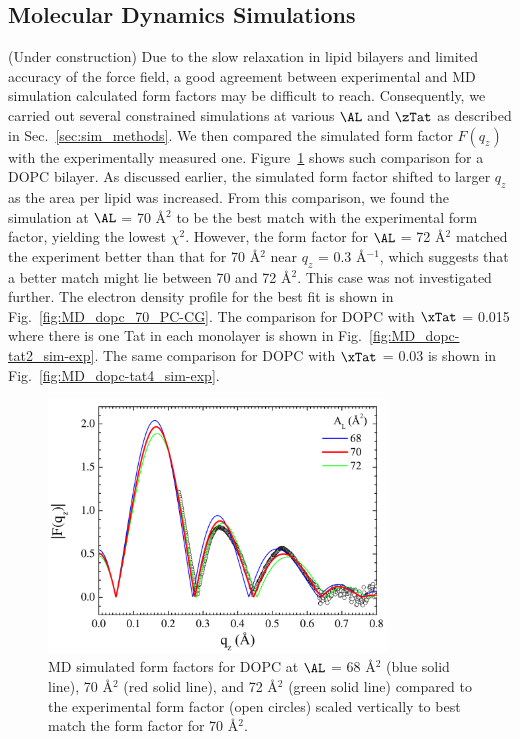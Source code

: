 \subsection{Molecular Dynamics Simulations}\label{sec:sim_results}
(Under construction)
Due to the slow relaxation in lipid bilayers and limited accuracy of the force 
field, a good agreement between experimental and MD simulation calculated 
form factors may be difficult to reach. Consequently, we carried out several 
constrained simulations at various $\AL$ and $\zTat$ as described
in Sec.~\ref{sec:sim_methods}. 
We then compared the simulated form factor $F(q_z)$ with the
experimentally measured one. Figure~\ref{fig:MD_dopc_sim-exp} shows such
comparison for a DOPC bilayer. As discussed earlier, the simulated form factor
shifted to larger $q_z$ as the area per lipid was increased. 
From this comparison, we found the simulation
at $\AL$ = 70 \AA$^2$ to be the best match with the experimental form
factor, yielding the lowest $\chi^2$. 
However, the form factor for $\AL$ = 72 \AA$^2$ matched the experiment
better than that for 70 \AA$^2$ near $q_z$ = 0.3 \AA$^{-1}$, which 
suggests that a better match might lie between 70 and 72 \AA$^2$. 
This case was not investigated further.
The electron density profile for the best fit is shown in 
Fig.~\ref{fig:MD_dopc_70_PC-CG}.
The comparison for DOPC with $\xTat$ = 0.015 where there is one Tat in
each monolayer is shown in Fig.~\ref{fig:MD_dopc-tat2_sim-exp}. The
same comparison for DOPC with $\xTat$ = 0.03 is shown in 
Fig.~\ref{fig:MD_dopc-tat4_sim-exp}.

\begin{figure}[htbp]
  \centering
  \includegraphics[width=0.8\textwidth]{figures/Tat/MD_Results/xff/dopc_sim-exp}
  \caption{MD simulated form factors for DOPC at $\AL$ = 68 \AA$^2$ (blue solid line), 
  70 \AA$^2$ (red solid line), and 72 \AA$^2$ (green solid line)
  compared to the experimental form factor (open circles) scaled vertically
  to best match the form factor for 70 \AA$^2$.}
  \label{fig:MD_dopc_sim-exp}
\end{figure}

